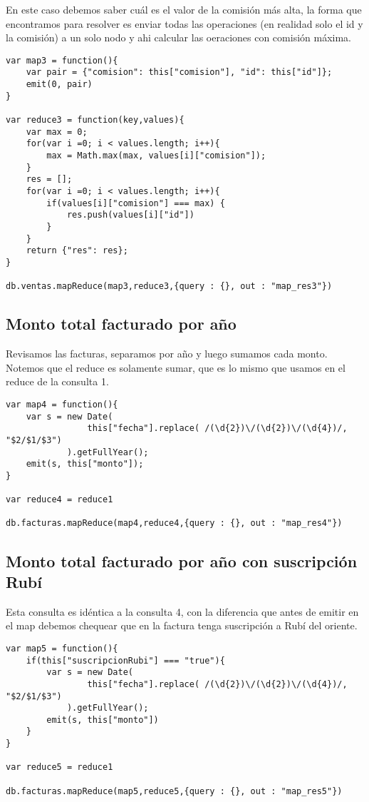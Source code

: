 En este caso debemos saber cuál es el valor de la comisión más alta, la forma que encontramos para resolver es enviar todas las operaciones (en realidad solo el id y la comisión) a un solo nodo y ahi calcular las oeraciones con comisión máxima.

\begin{verbatim}
var map3 = function(){
    var pair = {"comision": this["comision"], "id": this["id"]};
    emit(0, pair)
}

var reduce3 = function(key,values){
    var max = 0;
    for(var i =0; i < values.length; i++){
        max = Math.max(max, values[i]["comision"]);
    }
    res = [];
    for(var i =0; i < values.length; i++){
        if(values[i]["comision"] === max) {
            res.push(values[i]["id"])
        }
    }	
    return {"res": res};
}

db.ventas.mapReduce(map3,reduce3,{query : {}, out : "map_res3"})
\end{verbatim}

\subsection{Monto total facturado por año}

Revisamos las facturas, separamos por año y luego sumamos cada monto. Notemos que el reduce es solamente sumar, que es lo mismo que usamos en el reduce de la consulta 1.

\begin{verbatim}
var map4 = function(){
    var s = new Date(
                this["fecha"].replace( /(\d{2})\/(\d{2})\/(\d{4})/, "$2/$1/$3")
            ).getFullYear();
    emit(s, this["monto"]);
}

var reduce4 = reduce1

db.facturas.mapReduce(map4,reduce4,{query : {}, out : "map_res4"})
\end{verbatim}

\subsection{Monto total facturado por año con suscripción Rubí}

Esta consulta es idéntica a la consulta 4, con la diferencia que antes de emitir en el map debemos chequear que en la factura tenga suscripción a Rubí del oriente.

\begin{verbatim}
var map5 = function(){
    if(this["suscripcionRubi"] === "true"){
        var s = new Date(
                this["fecha"].replace( /(\d{2})\/(\d{2})\/(\d{4})/, "$2/$1/$3")
            ).getFullYear();
        emit(s, this["monto"])		
    }
}

var reduce5 = reduce1

db.facturas.mapReduce(map5,reduce5,{query : {}, out : "map_res5"})
\end{verbatim}

